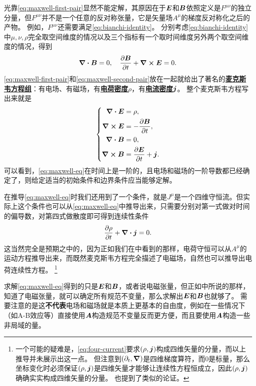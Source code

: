 \documentclass[UTF8, a4paper]{ctexart}
\renewcommand{\emph}[1]{\textbf{#1}}
\newcommand*{\concept}[1]{\underline{\textbf{#1}}}
\begin{document}
光靠\eqref{eq:maxwell-first-pair}显然不能定解，其原因在于$\vb*{E}$和$\vb*{B}$依照定义是$F^{\mu \nu}$的独立分量，但$F^{\mu \nu}$并不是一个任意的反对称张量，它是矢量场$A^\mu$的梯度反对称化之后的产物。
例如，$F^{\mu \nu}$还需要满足\eqref{eq:bianchi-identity}。
分别考虑\eqref{eq:bianchi-identity}中$\mu, \nu, \rho$完全取空间维度的情况以及三个指标有一个取时间维度另外两个取空间维度的情况，得到
\begin{equation}
    \div{\vb*{B}} = 0, \quad \pdv{\vb*{B}}{t} + \curl{\vb*{E}} = 0.
    \label{eq:maxwell-second-pair}
\end{equation}
\eqref{eq:maxwell-first-pair}和\eqref{eq:maxwell-second-pair}放在一起就给出了著名的\concept{麦克斯韦方程组}：有电场、有磁场，有\concept{电荷密度}$\rho$，有\concept{电流密度}$\vb*{j}$。
整个麦克斯韦方程写出来就是
\begin{equation}
    \left\{
        \begin{aligned}
            \div{\vb*{E}} &= \rho, \\
            \curl{\vb*{E}} &= - \pdv{\vb*{B}}{t}, \\
            \div{\vb*{B}} &= 0, \\
            \curl{\vb*{B}} &= \pdv{\vb*{E}}{t} + \vb*{j}.
        \end{aligned}
    \right.
    \label{eq:maxwell-eq}
\end{equation}
可以看到，\eqref{eq:maxwell-eq}在时间上是一阶的，且电场和磁场的一阶导数都已经确定了，则给定适当的初始条件和边界条件应当能够定解。

在推导\eqref{eq:maxwell-eq}时我们还用到了一个条件，就是$J^\mu$是一个四维守恒流。但实际上这个条件也可以从\eqref{eq:maxwell-eq}中推导出来，只需要分别对第一式做对时间的偏导数，对第四式做散度即可得到连续性条件
\begin{equation}
    \pdv{\rho}{t} + \div{\vb*{j}} = 0.
\end{equation}
这当然完全是预期之中的，因为正如我们在中看到的那样，电荷守恒可以从$A^\mu$的运动方程推导出来，而既然麦克斯韦方程完全描述了电磁场，自然也可以推导出电荷连续性方程。%
\footnote{一个可能的疑难是，\eqref{eq:four-current}要求$(\rho, \vb*{j})$构成四维矢量的分量，而以上推导并未展示出这一点。
但注意到$(\partial_t, \grad)$是四维梯度算符，而$0$是标量，那么坐标变化时必须保证$(\rho, \vb*{j})$是四维矢量才能够让连续性方程恒成立，因此$(\rho, \vb*{j})$确确实实构成四维矢量的分量。
也提到了类似的论证。}%

求解\eqref{eq:maxwell-eq}得到的只是$\vb*{E}$和$\vb*{B}$，或者说电磁张量，但正如中所说的那样，知道了电磁张量，就可以确定所有规范不变量，那么求解出$\vb*{E}$和$\vb*{B}$也就够了。
需要注意的是这\emph{不代表}电场和磁场就是本质上更基本的自由度，例如在一些情况下（如A-B效应等）直接使用$\vb*{A}$构造规范不变量反而更方便，而且要使用$\vb*{A}$构造一些非局域的量。
\end{document}
